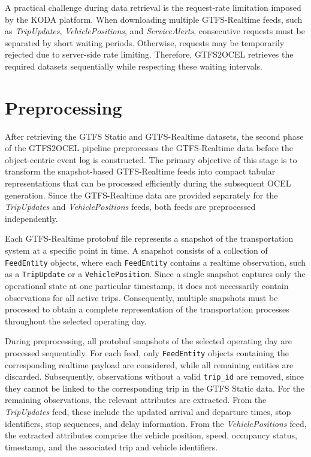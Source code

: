 A practical challenge during data retrieval is the request-rate limitation imposed by the KODA platform. When downloading multiple GTFS-Realtime feeds, such as \textit{TripUpdates}, \textit{VehiclePositions}, and \textit{ServiceAlerts}, consecutive requests must be separated by short waiting periods. Otherwise, requests may be temporarily rejected due to server-side rate limiting. Therefore, GTFS2OCEL retrieves the required datasets sequentially while respecting these waiting intervals.


\section{Preprocessing}

After retrieving the GTFS Static and GTFS-Realtime datasets, the second phase of the GTFS2OCEL pipeline preprocesses the GTFS-Realtime data before the object-centric event log is constructed. The primary objective of this stage is to transform the snapshot-based GTFS-Realtime feeds into compact tabular representations that can be processed efficiently during the subsequent OCEL generation. Since the GTFS-Realtime data are provided separately for the \textit{TripUpdates} and \textit{VehiclePositions} feeds, both feeds are preprocessed independently.

Each GTFS-Realtime protobuf file represents a snapshot of the transportation system at a specific point in time. A snapshot consists of a collection of \texttt{FeedEntity} objects, where each \texttt{FeedEntity} contains a realtime observation, such as a \texttt{TripUpdate} or a \texttt{VehiclePosition}. Since a single snapshot captures only the operational state at one particular timestamp, it does not necessarily contain observations for all active trips. Consequently, multiple snapshots must be processed to obtain a complete representation of the transportation processes throughout the selected operating day.

During preprocessing, all protobuf snapshots of the selected operating day are processed sequentially. For each feed, only \texttt{FeedEntity} objects containing the corresponding realtime payload are considered, while all remaining entities are discarded. Subsequently, observations without a valid \texttt{trip\_id} are removed, since they cannot be linked to the corresponding trip in the GTFS Static data. For the remaining observations, the relevant attributes are extracted. From the \textit{TripUpdates} feed, these include the updated arrival and departure times, stop identifiers, stop sequences, and delay information. From the \textit{VehiclePositions} feed, the extracted attributes comprise the vehicle position, speed, occupancy status, timestamp, and the associated trip and vehicle identifiers.


